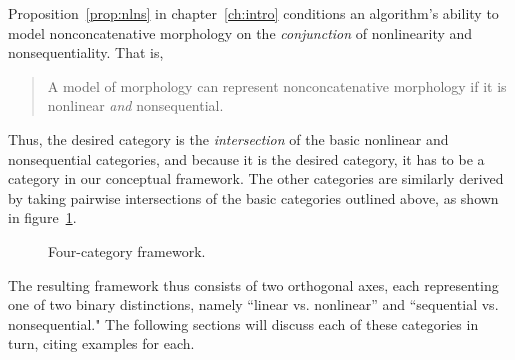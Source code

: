 Proposition~\ref{prop:nlns} in chapter~\ref{ch:intro} conditions an algorithm's ability to model nonconcatenative morphology on the \emph{conjunction} of nonlinearity and nonsequentiality. That is, 
\begin{quote}\noindent
A model of morphology can represent nonconcatenative morphology if it is nonlinear \emph{and} nonsequential.
\end{quote}
Thus, the desired category is the \emph{intersection} of the basic nonlinear and nonsequential categories, and because it is the desired category, it has to be a category in our conceptual framework.
The other categories are similarly derived by taking pairwise intersections of the basic categories outlined above, as shown in figure~\ref{fig:intersections}.
\begin{figure}[!h]
\centering
{}
\label{fig:intersections}
\caption{Four-category framework.}
\end{figure}
The resulting framework thus consists of two orthogonal axes, each representing one of two binary distinctions,
namely ``linear vs. nonlinear'' and ``sequential vs. nonsequential." The following sections will discuss each of these categories
in turn, citing examples 
for each. 

 

